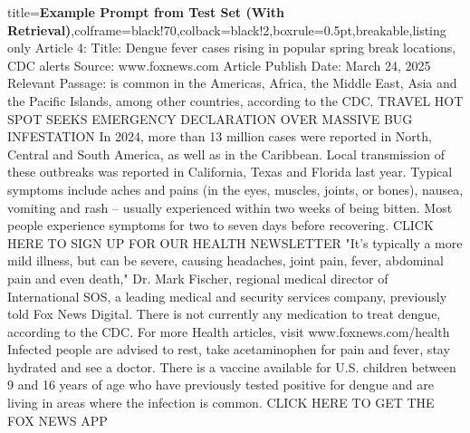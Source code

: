 \begin{tcblisting}{title={\textbf{Example Prompt from Test Set (With Retrieval)}},colframe=black!70,colback=black!2,boxrule=0.5pt,breakable,listing only}
Article 4:
Title: Dengue fever cases rising in popular spring break locations, CDC alerts
Source: www.foxnews.com
Article Publish Date: March 24, 2025
Relevant Passage: is common in the Americas, Africa, the Middle East, Asia and the Pacific Islands, among other countries, according to the CDC. TRAVEL HOT SPOT SEEKS EMERGENCY DECLARATION OVER MASSIVE BUG INFESTATION In 2024, more than 13 million cases were reported in North, Central and South America, as well as in the Caribbean. Local transmission of these outbreaks was reported in California, Texas and Florida last year. Typical symptoms include aches and pains (in the eyes, muscles, joints, or bones), nausea, vomiting and rash  --  usually experienced within two weeks of being bitten. Most people experience symptoms for two to seven days before recovering. CLICK HERE TO SIGN UP FOR OUR HEALTH NEWSLETTER "It's typically a more mild illness, but can be severe, causing headaches, joint pain, fever, abdominal pain and even death," Dr. Mark Fischer, regional medical director of International SOS, a leading medical and security services company, previously told Fox News Digital. There is not currently any medication to treat dengue, according to the CDC. For more Health articles, visit www.foxnews.com/health Infected people are advised to rest, take acetaminophen for pain and fever, stay hydrated and see a doctor. There is a vaccine available for U.S. children between 9 and 16 years of age who have previously tested positive for dengue and are living in areas where the infection is common. CLICK HERE TO GET THE FOX NEWS APP


\end{tcblisting}
